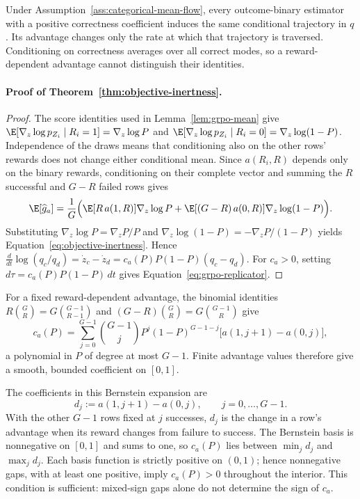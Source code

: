 Under Assumption~\ref{ass:categorical-mean-flow}, every outcome-binary
estimator with a positive correctness coefficient induces the same
conditional trajectory in $q$. Its advantage changes only the rate at which
that trajectory is traversed. Conditioning on correctness averages over all
correct modes, so a reward-dependent advantage cannot distinguish their
identities.

\paragraph{Proof of Theorem~\ref{thm:objective-inertness}.}

\begin{proof}
\enforcehalffinalproseline
The score identities used in Lemma~\ref{lem:grpo-mean} give
$\E[\nabla_z\log p_{Z_i}\mid R_i=1]=\nabla_z\log P$ and
$\E[\nabla_z\log p_{Z_i}\mid R_i=0]=\nabla_z\log(1-P)$.
Independence of the draws means that conditioning also on the other rows'
rewards does not change either conditional mean. Since $a(R_i,R)$ depends
only on the binary rewards, conditioning on their complete vector and
summing the $R$ successful and $G-R$ failed rows gives
\[
  \E[\widehat g_a]
  =\frac1G\Big(\E[R\,a(1,R)]\nabla_z\log P
   +\E[(G-R)\,a(0,R)]\nabla_z\log(1-P)\Big).
\]
Substituting $\nabla_z\log P=\nabla_zP/P$ and
$\nabla_z\log(1-P)=-\nabla_zP/(1-P)$ yields
Equation~\eqref{eq:objective-inertness}. Hence
$\frac{d}{dt}\log(q_c/q_d)=\dot z_c-\dot z_d=c_a(P)P(1-P)(q_c-q_d)$.
For $c_a>0$, setting $d\tau=c_a(P)P(1-P)\,dt$ gives
Equation~\eqref{eq:grpo-replicator}.
\end{proof}

For a fixed reward-dependent advantage, the binomial identities
$R\binom GR=G\binom{G-1}{R-1}$ and
$(G-R)\binom GR=G\binom{G-1}{R}$ give
\begin{equation}
 c_a(P)=\sum_{j=0}^{G-1}\binom{G-1}{j}P^j(1-P)^{G-1-j}
 \big[a(1,j+1)-a(0,j)\big],
 \label{eq:inertness-polynomial}
\end{equation}
a polynomial in $P$ of degree at most $G-1$. Finite advantage values
therefore give a smooth, bounded coefficient on $[0,1]$.

The coefficients in this Bernstein expansion are
\begin{equation}
 d_j:=a(1,j+1)-a(0,j),\qquad j=0,\ldots,G-1 .
 \label{eq:leave-one-out-gap}
\end{equation}
With the other $G-1$ rows fixed at $j$ successes, $d_j$ is the change in a
row's advantage when its reward changes from failure to success. The
Bernstein basis is nonnegative on $[0,1]$ and sums to one, so $c_a(P)$ lies
between $\min_jd_j$ and $\max_jd_j$. Each basis function is strictly positive
on $(0,1)$; hence nonnegative gaps, with at least one positive, imply
$c_a(P)>0$ throughout the interior. This condition is sufficient:
mixed-sign gaps alone do not determine the sign of $c_a$.

